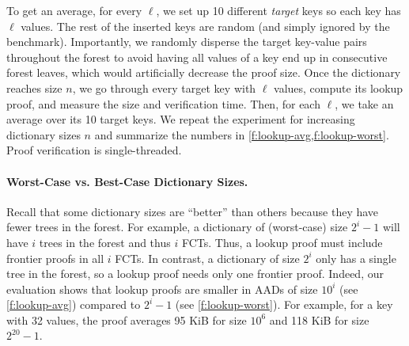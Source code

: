 To get an average, for every $\ell$, we set up 10 different \textit{target} keys so each key has $\ell$ values.
The rest of the inserted keys are random (and simply ignored by the benchmark).
Importantly, we randomly disperse the target key-value pairs throughout the forest to avoid having all values of a key end up in consecutive forest leaves, which would artificially decrease the proof size.
Once the dictionary reaches size $n$, we go through every target key with $\ell$ values, compute its lookup proof, and measure the size and verification time.
Then, for each $\ell$, we take an average over its 10 target keys.
We repeat the experiment for increasing dictionary sizes $n$ and summarize the numbers in \cref{f:lookup-avg,f:lookup-worst}.
Proof verification is single-threaded.

\paragraph{Worst-Case vs. Best-Case Dictionary Sizes.}
Recall that some dictionary sizes are ``better'' than others because they have fewer trees in the forest.
For example, a dictionary of (worst-case) size $2^i - 1$ will have $i$ trees in the forest and thus $i$ FCTs.
Thus, a lookup proof must include frontier proofs in all $i$ FCTs.
In contrast, a dictionary of size $2^i$ only has a single tree in the forest, so a lookup proof needs only one {frontier proof}.
Indeed, our evaluation shows that lookup proofs are smaller in AADs of size $10^i$ (see \cref{f:lookup-avg}) compared to $2^i-1$ (see \cref{f:lookup-worst}).
For example, for a key with 32 values, the proof averages 95 KiB for size $10^6$ and 118 KiB for size $2^{20} - 1$.



